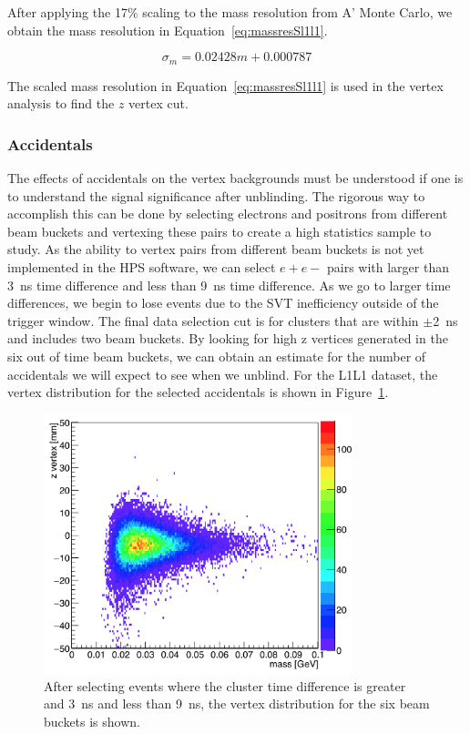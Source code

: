 \documentclass[twoside]{article}
\begin{document}
After applying the 17$\%$ scaling to the mass resolution from A' Monte Carlo, we obtain the mass resolution in Equation~\eqref{eq:massresSl1l1}.

\begin{equation}
\label{eq:massresSl1l1}
\sigma_m = 0.02428m+0.000787
\end{equation}

The scaled mass resolution in Equation~\eqref{eq:massresSl1l1} is used in the vertex analysis to find the $z$ vertex cut. 

 \subsubsection{Accidentals}

The effects of accidentals on the vertex backgrounds must be understood if one is to understand the signal significance after unblinding. The rigorous way to accomplish this can be done by selecting electrons and positrons from different beam buckets and vertexing these pairs to create a high statistics sample to study. As the ability to vertex pairs from different beam buckets is not yet implemented in the HPS software, we can select $e+e-$ pairs with larger than 3~ns time difference and less than 9~ns time difference. As we go to larger time differences, we begin to lose events due to the SVT inefficiency outside of the trigger window. The final data selection cut is for clusters that are within $\pm$2~ns and includes two beam buckets. By looking for high z vertices generated in the six out of time beam buckets, we can obtain an estimate for the number of accidentals we will expect to see when we unblind. For the L1L1 dataset, the vertex distribution for the selected accidentals is shown in Figure~\ref{fig:acc_L1L1}.

\begin{figure}[H]
  \centering
     \includegraphics[width=0.8\textwidth]{plots/zVm_acc_L1L1.png}
  \caption{After selecting events where the cluster time difference is greater and 3~ns and less than 9~ns, the vertex distribution for the six beam buckets is shown.}
  \label{fig:acc_L1L1}
\end{figure} 
\end{document}
